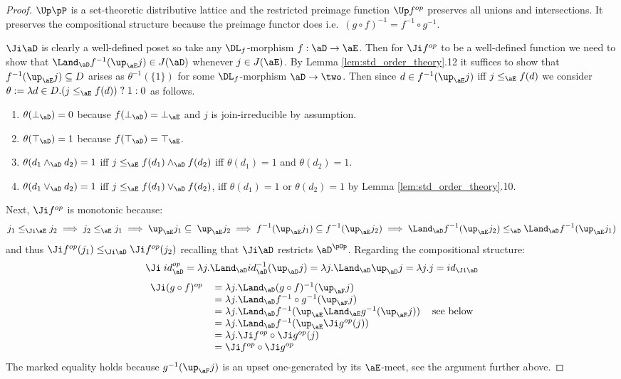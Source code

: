 \documentclass{article}
\begin{document}
\begin{proof}
$\Up\pP$ is a set-theoretic distributive lattice and the restricted preimage function $\Up f^{op}$ preserves all unions and intersections. It preserves the compositional structure because the preimage functor does i.e.\ $(g \circ f)^{-1} = f^{-1} \circ g^{-1}$. 

$\Ji\aD$ is clearly a well-defined poset so take any $\DL_f$-morphism $f : \aD \to \aE$. Then for $\Ji f^{op}$ to be a well-defined function we need to show that $\Land_\aD f^{-1}(\up_\aE j) \in J(\aD)$ whenever $j \in J(\aE)$. By Lemma \ref{lem:std_order_theory}.12 it suffices to show that $f^{-1}(\up_\aE j) \subseteq D$ arises as $\theta^{-1}(\{1\})$ for some $\DL_f$-morphism $\aD \to \two$. Then since $d \in f^{-1}(\up_\aE j)$ iff $j \leq_\aE f(d)$ we consider $\theta := \lambda d \in D.(j \leq_\aE f(d)) \;?\; 1 : 0$ as follows.
\begin{enumerate}
\item
$\theta(\bot_\aD) = 0$ because $f(\bot_\aD) = \bot_\aE$ and $j$ is join-irreducible by assumption.
\item
$\theta(\top_\aD) = 1$ because $f(\top_\aD) = \top_\aE$.
\item
$\theta(d_1 \land_\aD d_2) = 1$ iff $j \leq_\aE f(d_1) \land_\aD f(d_2)$ iff $\theta(d_1) = 1$ and $\theta(d_2) = 1$.
\item
$\theta(d_1 \lor_\aD d_2) = 1$ iff $j \leq_\aE f(d_1) \lor_\aD f(d_2)$, iff  $\theta(d_1) = 1$ or $\theta(d_2) = 1$ by Lemma \ref{lem:std_order_theory}.10.
\end{enumerate}

Next, $\Ji f^{op}$ is monotonic because:
\[
j_1 \leq_{\Ji\aE} j_2
\implies j_2 \leq_\aE j_1
\implies \up_\aE j_1 \subseteq \; \up_\aE j_2
\implies f^{-1}(\up_\aE j_1) \subseteq f^{-1}(\up_\aE j_2)
\implies \Land_\aD f^{-1}(\up_\aE j_2) \leq_{\aD} \Land_\aD f^{-1}(\up_\aE j_1)
\]
and thus $\Ji f^{op}(j_1) \leq_{\Ji\aD} \Ji f^{op}(j_2)$ recalling that $\Ji\aD$ restricts $\aD^{\pOp}$. Regarding the compositional structure:
\[
\Ji \; id_\aD^{op} = \lambda j.\Land_\aD id_\aD^{-1}(\up_\aD j) = \lambda j.\Land_\aD \up_\aD j = \lambda j.j = id_{\Ji\aD}
\]
\[
\begin{tabular}{lll}
$\Ji (g \circ f)^{op}$
&
$= \lambda j.\Land_\aD (g \circ f)^{-1}(\up_\aF j)$
\\&
$= \lambda j.\Land_\aD f^{-1} \circ g^{-1}(\up_\aF j)$
\\&
$= \lambda j.\Land_\aD f^{-1}(\up_\aE \Land_\aE g^{-1}(\up_\aF j))$
& see below
\\&
$= \lambda j.\Land_\aD f^{-1}(\up_\aE \Ji g^{op}(j))$
\\&
$= \lambda j.\Ji f^{op} \circ \Ji g^{op} (j)$
\\&
$= \Ji f^{op} \circ \Ji g^{op}$
\end{tabular}
\]
The marked equality holds because $g^{-1}(\up_\aF j)$ is an upset one-generated by its $\aE$-meet, see the argument further above.
\end{proof}
\end{document}
